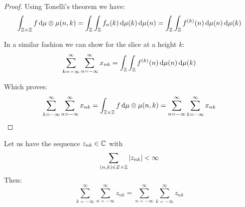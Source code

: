 \begin{proof}
    Using Tonelli's theorem we have:
    \[\int_{\mathbb{Z} \times \mathbb{Z}} f \, \mathrm{d}\mu \otimes \mu (n, k)
        = \int_{\mathbb{Z}} \int_{\mathbb{Z}} f_{n}(k) \, \mathrm{d}\mu(k) \, \mathrm{d}\mu(n)
        = \int_{\mathbb{Z}} \int_{\mathbb{Z}} f^{(k)}(n) \, \mathrm{d}\mu(n) \, \mathrm{d}\mu(k)\]

    In a similar fashion we can show for the slice at a height $k$:
    \[\sum_{k=-\infty}^{\infty} \sum_{n=-\infty}^{\infty} x_{nk}
        = \int_{\mathbb{Z}} \int_{\mathbb{Z}} f^{(k)}(n) \, \mathrm{d}\mu(n) \, \mathrm{d}\mu(k)\]

    Which proves:
    \[\sum_{k=-\infty}^{\infty} \sum_{n=-\infty}^{\infty} x_{nk}
        = \int_{\mathbb{Z} \times \mathbb{Z}} f \, \mathrm{d}\mu \otimes \mu (n, k)
        = \sum_{n=-\infty}^{\infty} \sum_{k=-\infty}^{\infty} x_{nk} \]
\end{proof}

\begin{theorem} \label{thm:discrete fubini}
    Let us have the sequence $z_{nk} \in \mathbb{C}$ with
    \[\sum_{(n, k) \in Z \times \mathbb{Z}} |z_{nk}| < \infty\]
    Then:
    \[
        \sum_{k=-\infty}^{\infty} \sum_{n=-\infty}^{\infty} z_{nk}
        = \sum_{n=-\infty}^{\infty} \sum_{k=-\infty}^{\infty} z_{nk}\]
\end{theorem}
